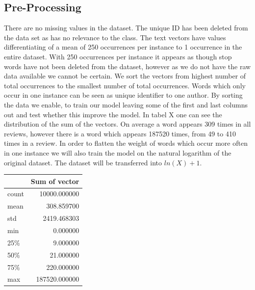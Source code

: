 \documentclass[11pt]{article}
\begin{document}
\subsection{Pre-Processing}
There are no missing values in the dataset. The unique ID has been deleted from the data set as has no relevance to the class. The text vectors have values differentiating of a mean of 250 occurrences per instance to 1 occurrence in the entire dataset. With 250 occurrences per instance it appears as though stop words have not been deleted from the dataset, however as we do not have the raw data available we cannot be certain. 
\newline
We sort the vectors from highest number of total occurrences to the smallest number of total occurrences. Words which only occur in one instance can be seen as unique identifier to one author.
By sorting the data we enable, to train our model  leaving some of the first and last columns out and test whether this improve the model.
\newline
In tabel X one can see the distribution of the sum of the vectors. On average a word appears 309 times in all reviews, however there is a word which appears 187520 times, from 49 to 410 times in a review.
\newline
In order to flatten the weight of words which occur more often in one instance we will also train the model on the natural logarithm of the original dataset. The dataset will be transferred into $ln(X)+1$.
\begin{tabular}{lr}
\toprule
{} &	Sum of vector \\
\midrule
count &   10000.000000 \\
mean  &     308.859700 \\
std   &    2419.468303 \\
min   &       0.000000 \\
25\%   &       9.000000 \\
50\%   &      21.000000 \\
75\%   &     220.000000 \\
max   &  187520.000000 \\
\bottomrule
\end{tabular}
\end{document}
